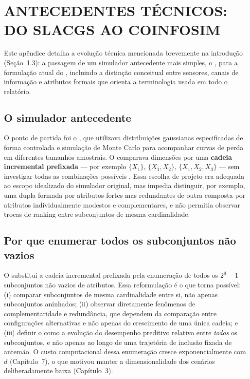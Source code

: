 \chapter{ANTECEDENTES TÉCNICOS: DO SLACGS AO COINFOSIM}
\label{ap:antecedentes}

Este apêndice detalha a evolução técnica mencionada brevemente na introdução (Seção~1.3): a passagem de um simulador antecedente mais simples, o \SLACGS{}, para a formulação atual do \CoInfoSim{}, incluindo a distinção conceitual entre sensores, canais de informação e atributos formais que orienta a terminologia usada em todo o relatório.

\section{O simulador antecedente}

O ponto de partida foi o \SLACGS{}, que utilizava distribuições gaussianas especificadas de forma controlada e simulação de Monte Carlo para acompanhar curvas de perda em diferentes tamanhos amostrais. O \SLACGS{} comparava dimensões por uma \textbf{cadeia incremental prefixada} --- por exemplo $\{X_1\}$, $\{X_1,X_2\}$, $\{X_1,X_2,X_3\}$ --- sem investigar todas as combinações possíveis \cite{azevedo2026coinfosim}. Essa escolha de projeto era adequada ao escopo idealizado do simulador original, mas impedia distinguir, por exemplo, uma dupla formada por atributos fortes mas redundantes de outra composta por atributos individualmente modestos e complementares, e não permitia observar trocas de ranking entre subconjuntos de mesma cardinalidade.

\section{Por que enumerar todos os subconjuntos não vazios}

O \CoInfoSim{} substitui a cadeia incremental prefixada pela enumeração de todos os $2^d-1$ subconjuntos não vazios de atributos. Essa reformulação é o que torna possível: (i) comparar subconjuntos de mesma cardinalidade entre si, não apenas subconjuntos aninhados; (ii) observar diretamente fenômenos de complementaridade e redundância, que dependem da comparação entre configurações alternativas e não apenas do crescimento de uma única cadeia; e (iii) definir o \PredictiveCooperationProfile{} como a evolução do desempenho preditivo relativo entre \emph{todos} os subconjuntos, e não apenas ao longo de uma trajetória de inclusão fixada de antemão. O custo computacional dessa enumeração cresce exponencialmente com $d$ (Capítulo~7), o que motivou manter a dimensionalidade dos cenários deliberadamente baixa (Capítulo~3).

